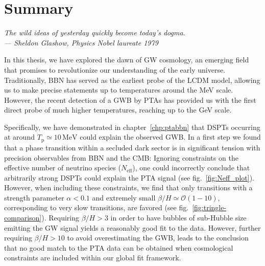 \chapter{Summary} \label{chp:summary}

\begin{flushright}
	\slshape
	The wild ideas of yesterday quickly become today's dogma.\\ \medskip
	--- Sheldon Glashow, Physics Nobel laureate 1979
\end{flushright}

In this thesis, we have explored the dawn of \ac{GW} cosmology, an emerging field that promises to revolutionize our understanding of the early universe. Traditionally, \ac{BBN} has served as the earliest probe of the \ac{LCDM} model, allowing us to make  precise statements up to temperatures around the MeV scale. However, the recent detection of a \acf{GWB} by \acfp{PTA} has provided us with the first direct probe of much higher temperatures, reaching up to the GeV scale.

Specifically, we have demonstrated in chapter~\ref{chp:ptabbn} that \acfp{DSPT} occurring at around $T_\text{p} \simeq 10 \, \text{MeV}$ could explain the observed \ac{GWB}. In a first step we found that a phase transition within a secluded dark sector is in significant tension with precision observables from \ac{BBN} and the \ac{CMB}: Ignoring constraints  on the effective number of neutrino species ($N_{\text{eff}}$), one could incorrectly conclude that arbitrarily strong \acp{DSPT} could explain the \ac{PTA} signal (see fig.~\ref{fig:Neff_plot}). However, when including these constraints, we find that only transitions with a strength parameter $\alpha < 0.1$ and extremely small $\beta/H \simeq \mathcal{O}(1-10)$, corresponding to very slow transitions, are favored (see fig.~\ref{fig:tringle-comparison}). Requiring $\beta/H > 3$ in order to have bubbles of sub-Hubble size emitting the \ac{GW} signal yields a reasonably good fit to the data. However, further requiring $\beta/H > 10$ to avoid overestimating the \ac{GWB}, leads to the conclusion that no good match to the \ac{PTA} data can be obtained when cosmological constraints are included within our global fit framework.

